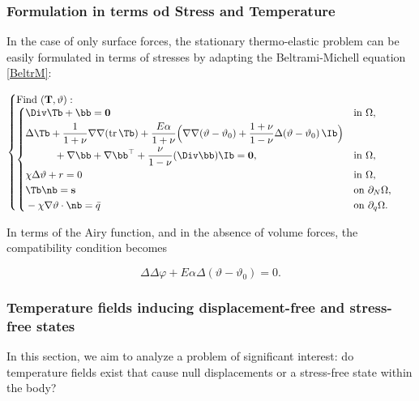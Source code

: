 \subsubsection{Formulation in terms od Stress and Temperature}
In the case of only surface forces, the stationary thermo-elastic problem can be easily formulated in terms of stresses by adapting the Beltrami-Michell equation \eqref{BeltrM}:
\begin{definition}
	\begin{equation}\label{thst}
		\begin{cases}
			\mathrm{Find~}(\mathbf{T},\vartheta):\\
			\begin{cases}
				\begin{aligned}
					&\Div \Tb + \bb = \mathbf{0} \quad &&\mathrm{in~}\Omega,\\
					&\Delta \Tb + \frac{1}{1+\nu} \nabla \nabla (\operatorname{tr} \Tb) + \frac{E \alpha}{1+\nu} \Big( \nabla \nabla (\vartheta - \vartheta_0) + \frac{1+\nu}{1-\nu} \Delta (\vartheta - \vartheta_0) \,\Ib \Big)\\
					&\hspace{1cm} + \nabla \bb + \nabla \bb^\top + \frac{\nu}{1-\nu} (\Div \bb) \Ib = \mathbf{0}, \quad &&\mathrm{in~}\Omega,\\
					&\chi \Delta \vartheta + r = 0  \quad &&\mathrm{in~}\Omega,\\
					&\Tb \nb = \mathbf{s} &&\mathrm{on~}\partial_N\Omega,\\
					&-\chi \nabla \vartheta \cdot \nb = \bar{q} &&\mathrm{on~}\partial_q\Omega.
				\end{aligned}
			\end{cases}
		\end{cases}
	\end{equation}
\end{definition}

In terms of the Airy function, and in the absence of volume forces, the compatibility condition becomes
\begin{definition}
	\begin{equation}\label{airythe}
		\Delta \Delta \varphi + E \alpha \Delta (\vartheta - \vartheta_0) = 0.
	\end{equation}
\end{definition}

\vspace{.5cm}

\subsubsection{Temperature fields inducing displacement-free and stress-free states}
In this section, we aim to analyze a problem of significant interest: do temperature fields exist that cause null displacements or a stress-free state within the body?

